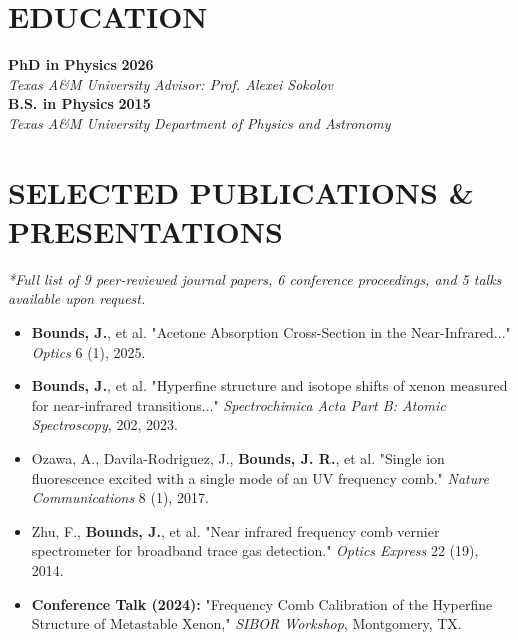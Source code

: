 \documentclass[a4paper,10pt]{extarticle}
\newcommand{\resumeentry}[4]{
	\noindent\textbf{#2} \hfill \textbf{#1}\\
	\textit{#3} \hfill \textit{#4}\\[0.2em]
}
\begin{document}
	\section*{EDUCATION}
	\resumeentry{2026}{PhD in Physics}{Texas A\&M University}{Advisor: Prof. Alexei Sokolov}
	\resumeentry{2015}{B.S. in Physics}{Texas A\&M University}{Department of Physics and Astronomy}
	
	\section*{SELECTED PUBLICATIONS \& PRESENTATIONS}
	\textit{*Full list of 9 peer-reviewed journal papers, 6 conference proceedings, and 5 talks available upon request.}
	\begin{itemize}[leftmargin=1.2em, itemsep=0.2em]
		\item \textbf{Bounds, J.}, et al. "Acetone Absorption Cross-Section in the Near-Infrared..." \textit{Optics} 6 (1), 2025.
		\item \textbf{Bounds, J.}, et al. "Hyperfine structure and isotope shifts of xenon measured for near-infrared transitions..." \textit{Spectrochimica Acta Part B: Atomic Spectroscopy}, 202, 2023.
		\item Ozawa, A., Davila-Rodriguez, J., \textbf{Bounds, J. R.}, et al. "Single ion fluorescence excited with a single mode of an UV frequency comb." \textit{Nature Communications} 8 (1), 2017.
		\item Zhu, F., \textbf{Bounds, J.}, et al. "Near infrared frequency comb vernier spectrometer for broadband trace gas detection." \textit{Optics Express} 22 (19), 2014.
		\item \textbf{Conference Talk (2024):} "Frequency Comb Calibration of the Hyperfine Structure of Metastable Xenon," \textit{SIBOR Workshop}, Montgomery, TX.
	\end{itemize}
	
\end{document}
